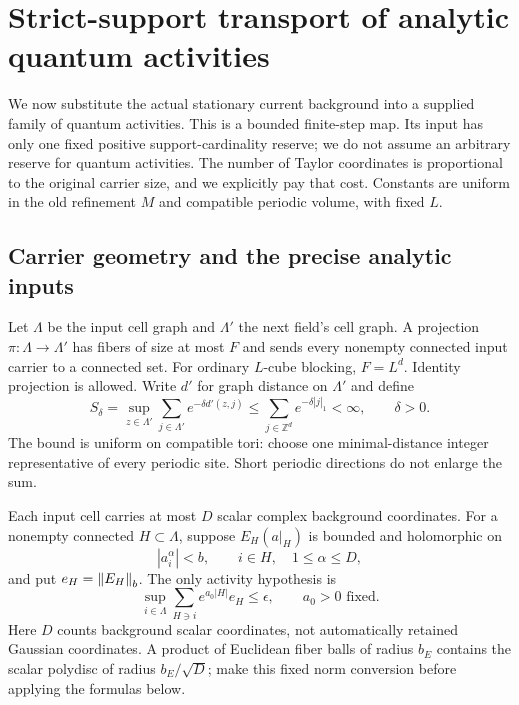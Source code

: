 \section{Strict-support transport of analytic quantum activities}
\label{qt-section}

We now substitute the actual stationary current background into a
supplied family of quantum activities. This is a bounded finite-step
map. Its input has only one fixed positive support-cardinality reserve;
we do not assume an arbitrary reserve for quantum activities. The
number of Taylor coordinates is proportional to the original carrier
size, and we explicitly pay that cost. Constants are uniform in the
old refinement $M$ and compatible periodic volume, with fixed $L$.

\subsection{Carrier geometry and the precise analytic inputs}
\label{qt-input-section}

Let $\Lambda$ be the input cell graph and $\Lambda'$ the next field's
cell graph. A projection $\pi:\Lambda\to\Lambda'$ has fibers of size
at most $F$ and sends every nonempty connected input carrier to a
connected set. For ordinary $L$-cube blocking, $F=L^d$. Identity
projection is allowed. Write $d'$ for graph distance on $\Lambda'$ and
define
\begin{equation}\label{qt-distance-sum}
 S_\delta=\sup_{z\in\Lambda'}\sum_{j\in\Lambda'}e^{-\delta d'(z,j)}
 \le\sum_{j\in\mathbb Z^d}e^{-\delta|j|_1}<\infty,
 \qquad \delta>0.
\end{equation}
The bound is uniform on compatible tori: choose one minimal-distance
integer representative of every periodic site. Short periodic
directions do not enlarge the sum.

Each input cell carries at most $D$ scalar complex background
coordinates. For a nonempty connected $H\subset\Lambda$, suppose
$E_H(a|_H)$ is bounded and holomorphic on
\begin{equation}\label{qt-input-domain}
 |a_i^\alpha|<b,\qquad i\in H,\quad 1\le\alpha\le D,
\end{equation}
and put $e_H=\left\|E_H\right\|_b$. The only activity hypothesis is
\begin{equation}\label{qt-input-norm}
 \sup_{i\in\Lambda}\sum_{H\ni i}e^{a_0|H|}e_H\le\epsilon,
 \qquad a_0>0\text{ fixed}.
\end{equation}
Here $D$ counts background scalar coordinates, not automatically
retained Gaussian coordinates. A product of Euclidean fiber balls of
radius $b_E$ contains the scalar polydisc of radius $b_E/\sqrt D$;
make this fixed norm conversion before applying the formulas below.

